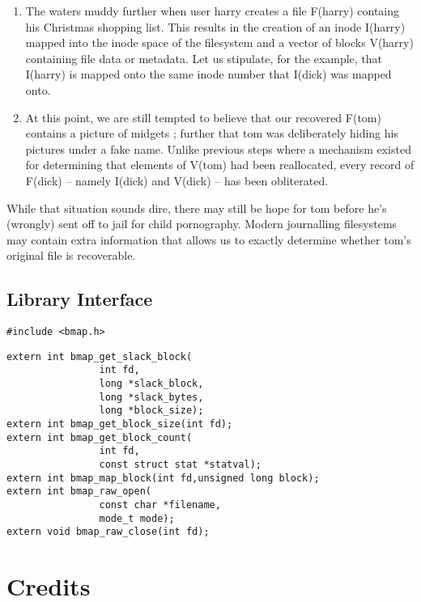 \documentclass[letterpaper]{article}
\begin{document}
\begin{enumerate}
\item The waters muddy further when user {\ttfamily harry} creates a
file F(harry) containg his Christmas shopping list. This results
in the creation of an inode I(harry) mapped into the inode
space of the filesystem and a vector of blocks V(harry)
containing file data or metadata. Let us stipulate, for the example,
that I(harry) is mapped onto the same inode number that
I(dick) was mapped onto. 
\item At this point, we are still tempted to believe that
our recovered F(tom) contains a picture of midgets ;
further that {\ttfamily tom} was deliberately hiding his
pictures under a fake name. Unlike previous steps where
a mechanism existed for determining that elements of V(tom)
had been reallocated, every record of F(dick) -- namely I(dick) and
V(dick) -- has been obliterated.
\end{enumerate}


While that situation sounds dire, there may still be hope for {\ttfamily tom} before he's (wrongly) sent off to jail for child pornography. Modern
journalling filesystems may contain extra information that allows us
to exactly determine whether tom's original file is recoverable.




\subsection{Library Interface}

\begin{verbatim}
#include <bmap.h>
\end{verbatim}


\begin{verbatim}
extern int bmap_get_slack_block(
                int fd,
                long *slack_block,
                long *slack_bytes,
                long *block_size);
extern int bmap_get_block_size(int fd);
extern int bmap_get_block_count(
                int fd,
                const struct stat *statval);
extern int bmap_map_block(int fd,unsigned long block);
extern int bmap_raw_open(
                const char *filename,
                mode_t mode);
extern void bmap_raw_close(int fd);
\end{verbatim}





\section{Credits}
\end{document}

